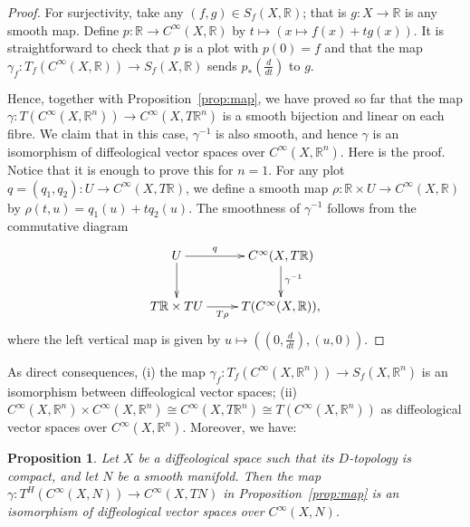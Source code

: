 \documentclass{amsart}
\newtheorem{prop}[de]{Proposition}
\theoremstyle{remark}
\newcommand{\ra}{\to}
\def \R{\mathbb{R}}
\begin{document}
\begin{proof}
For surjectivity,
take any $(f,g) \in S_f(X,\R)$; that is $g:X \ra \R$ is any smooth map.
Define $p:\R \ra C^\infty(X,\R)$ by $t \mapsto (x \mapsto f(x)+tg(x))$.
It is straightforward to check that $p$ is a plot with $p(0)=f$ and
that the map $\gamma_f:T_f(C^\infty(X,\R)) \ra S_f(X,\R)$
sends $p_*(\frac{d}{dt})$ to $g$.

Hence, together with Proposition~\ref{prop:map},
we have proved so far that the  map $\gamma:T(C^\infty(X,\R^n)) \ra C^\infty(X,T\R^n)$
is a smooth bijection and linear on each fibre.
We claim that in this case, $\gamma^{-1}$ is also smooth, and hence
$\gamma$ is an isomorphism of diffeological vector spaces over $C^\infty(X,\R^n)$.
Here is the proof.
Notice that it is enough to prove this for $n=1$.
For any plot $q=(q_1,q_2):U \ra C^\infty(X,T\R)$, we define
a smooth map $\rho:\R \times U \ra C^\infty(X,\R)$
by $\rho(t,u)=q_1(u)+tq_2(u)$.
The smoothness of $\gamma^{-1}$ follows from the commutative diagram
\[
\xymatrix{U \ar[d] \ar[r]^-q & C^\infty(X,T\R) \ar[d]^(0.45){\gamma^{-1}} \\ T\R \times TU \ar[r]_-{T\rho} & T(C^\infty(X,\R)),}
\]
where the left vertical map is given by $u \mapsto ((0,\frac{d}{dt}),(u,0))$.
\end{proof}

As direct consequences,
(i) the map $\gamma_f:T_f(C^\infty(X,\R^n)) \ra S_f(X,\R^n)$ is
an isomorphism between diffeological vector spaces;
(ii) $C^\infty(X,\R^n) \times C^\infty(X,\R^n) \cong C^\infty(X,T\R^n) \cong
T(C^\infty(X,\R^n))$ as diffeological vector spaces over $C^\infty(X,\R^n)$.
Moreover, we have:

\begin{prop}\label{prop:cpt}
Let $X$ be a diffeological space such that its $D$-topology is compact,
and let $N$ be a smooth manifold.
Then the map $\gamma:T^H(C^\infty(X,N)) \ra C^\infty(X,TN)$ in
Proposition~\ref{prop:map} is an isomorphism of diffeological vector
spaces over $C^\infty(X,N)$.
\end{prop}
\end{document}
